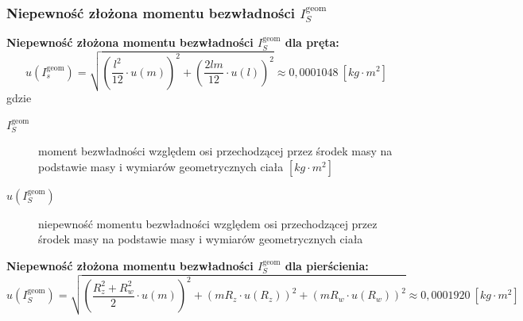 \documentclass[a4paper,11pt]{article}
\begin{document}
\subsubsection{Niepewność złożona momentu bezwładności $I_{S}^{\text{geom}}$}
\textbf{Niepewność złożona momentu bezwładności $I_{S}^{\text{geom}}$ dla pręta:}
\begin{equation}
u(I_{s}^{\text{geom}})=\sqrt{\left(\frac{l^2}{12}\cdot u(m) \right)^2+\left(\frac{2lm}{12}\cdot u(l) \right)^2}
\approx 0,0001048 ~ [kg\cdot m^2]
\end{equation}
gdzie 
\begin{description}
\item [$I_{S}^{\text{geom}}$] moment bezwładności względem osi przechodzącej przez środek masy na podstawie masy i wymiarów geometrycznych ciała $\left[kg \cdot m^{2} \right]$
\item [$u(I_{S}^{\text{geom}})$] niepewność momentu bezwładności względem osi przechodzącej przez środek masy na podstawie masy i wymiarów geometrycznych ciała 
\end{description}

\textbf{Niepewność złożona momentu bezwładności $I_{S}^{\text{geom}}$ dla pierścienia:}
\begin{equation}
u(I_{S}^{\text{geom}})=\sqrt{\left (\frac{R_z^2+R_w^2}{2}\cdot u(m) \right )^2+\left (mR_z\cdot u(R_z) \right )^2+\left (mR_w\cdot u(R_w) \right )^2} \approx 0,0001920 ~[kg\cdot m^2]
\end{equation}
\end{document}
